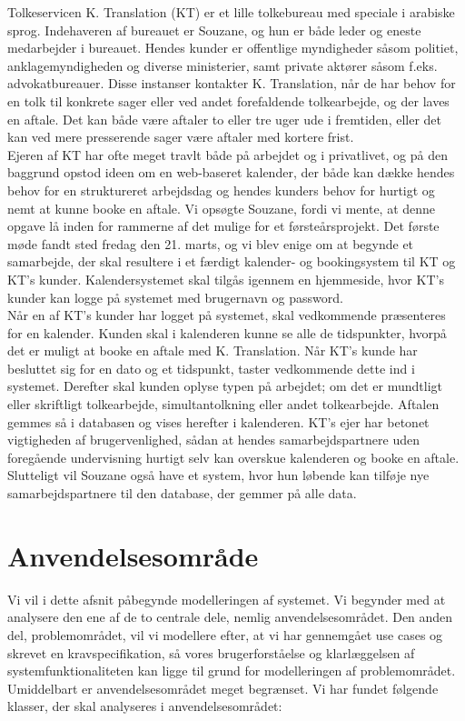 \documentclass[12pt]{article}   %
\begin{document}
Tolkeservicen K. Translation (KT) er et lille tolkebureau med speciale i arabiske 
sprog. Indehaveren af bureauet er Souzane, og hun er både leder og eneste
medarbejder i bureauet. Hendes kunder er offentlige myndigheder såsom politiet, anklagemyndigheden og diverse ministerier, samt private aktører såsom f.eks. advokatbureauer. Disse instanser kontakter K. Translation, når de har behov for en tolk til konkrete sager eller ved andet forefaldende tolkearbejde, og der laves en aftale. Det kan både være aftaler to eller tre uger ude i fremtiden, eller det kan ved mere presserende sager være aftaler med
kortere frist.\\
Ejeren af KT har ofte meget travlt både på arbejdet og i privatlivet, og på
den baggrund opstod ideen om en web-baseret kalender, der både kan dække hendes behov for en struktureret arbejdsdag og hendes kunders behov for hurtigt og nemt at kunne booke en aftale. Vi opsøgte Souzane, fordi vi mente, at denne opgave lå inden for rammerne af det mulige for et førsteårsprojekt. Det første møde fandt sted fredag den 21. marts, og vi blev enige om at begynde et samarbejde, der skal resultere i et færdigt kalender- og bookingsystem til KT og KT's kunder.
Kalendersystemet skal tilgås igennem en hjemmeside, hvor KT's kunder kan logge på systemet med brugernavn og password. \\
Når en af KT's kunder har logget på systemet, skal vedkommende præsenteres for en kalender. Kunden skal i kalenderen kunne se alle de tidspunkter, hvorpå det er muligt at booke en aftale med K. Translation. Når KT's kunde har besluttet sig for en dato og et tidspunkt, taster vedkommende dette ind i systemet. Derefter skal kunden oplyse typen på
arbejdet; om det er mundtligt eller skriftligt tolkearbejde, simultantolkning eller andet tolkearbejde. Aftalen gemmes så i databasen og vises herefter i kalenderen. KT's ejer har betonet vigtigheden af brugervenlighed, sådan at hendes samarbejdspartnere uden foregående undervisning 
hurtigt selv kan overskue kalenderen og booke en aftale. Slutteligt vil Souzane også have et system, hvor hun løbende kan tilføje nye samarbejdspartnere til den database, der gemmer på alle data. \\

\section{Anvendelsesområde}
Vi vil i dette afsnit påbegynde modelleringen af systemet. Vi begynder med at analysere den ene af de to centrale dele, nemlig anvendelsesområdet. Den anden del, problemområdet, vil vi modellere efter, at vi har gennemgået use cases og skrevet en kravspecifikation, så vores brugerforståelse og klarlæggelsen af systemfunktionaliteten kan ligge til grund for modelleringen af problemområdet. \\ 
Umiddelbart er anvendelsesområdet meget begrænset. Vi har fundet følgende klasser, der skal analyseres i anvendelsesområdet:
\end{document}
